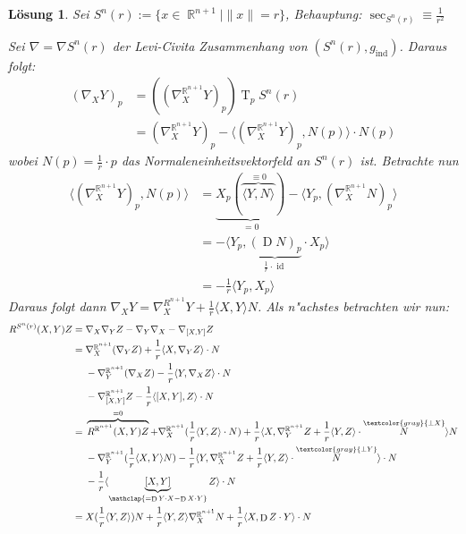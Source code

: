 \documentclass[paper=A4, twoside, chapterprefix=true, bibliography=totoc, headsepline]{scrbook}
\DeclareMathOperator{\R}{\mathbb{R}}
\DeclareMathOperator{\id}{id}       %
\DeclareMathOperator{\D}{D}         %
\DeclareMathOperator{\T}{T}         %
\theoremstyle{plain}
\theoremstyle{nonumberplain}
\theoremstyle{empty}
\theoremstyle{break}
\newtheorem{Loes}{L\"osung}
\begin{document}
\begin{Loes}
Sei $S^n(r) := \{x \in \R^{n+1} \mid \|x\| = r\}$, \emph{Behauptung:} $\sec_{S^n(r)} \equiv \frac{1}{r^2}$

Sei $\nabla = \nabla S^n(r)$ der Levi-Civita Zusammenhang von $(S^n(r), g_{\text{ind}})$. Daraus folgt:
\begin{align*}
	(\nabla_X Y)_p &= \left( (\nabla_X^{\R^{n+1}} Y)_p \right) \T_p S^n(r) \\
	&= (\nabla_X^{\R^{n+1}} Y)_p - \langle (\nabla_X^{\R^{n+1}} Y)_p, N(p) \rangle \cdot N(p)
\end{align*}
wobei $N(p) = \frac{1}{r} \cdot p$ das Normaleneinheitsvektorfeld an $S^n(r)$ ist. Betrachte nun
\begin{align*}
	\langle (\nabla_X^{\R^{n+1}} Y)_p, N(p) \rangle &= \underbrace{X_p ( \overbrace{\langle Y, N \rangle}^{\equiv 0} )}_{=0} - \langle Y_p, (\nabla_X^{\R^{n+1}} N)_p \rangle\\
	&= - \langle Y_p, \underbrace{(\D N)_p}_{\frac{1}{r}\cdot\id} \cdot X_p \rangle\\
	&= - \frac{1}{r} \langle Y_p, X_p \rangle
\end{align*}
Daraus folgt dann $\nabla_XY = \nabla_X^{R^{n+1}} Y + \frac{1}{r} \langle X, Y \rangle N$. Als n"achstes betrachten wir nun:
\begin{align*}
	R^{S^n(r)}(X,Y)Z ={}& \nabla_X \nabla_Y Z - \nabla_Y \nabla_X - \nabla_{[X,Y]}Z\\
	={}& \nabla_X^{\R^{n+1}} (\nabla_Y Z) + \frac{1}{r} \langle X, \nabla_Y Z \rangle \cdot N\\
		& - \nabla_Y^{\R^{n+1}} (\nabla_X Z) - \frac{1}{r} \langle Y, \nabla_X Z \rangle \cdot N\\
		& - \nabla_{[X,Y]}^{\R^{n+1}} Z - \frac{1}{r} \langle [X,Y], Z \rangle \cdot N\\
	={}& \overbrace{R^{\R^{n+1}} (X,Y)Z}^{=0} + \nabla_X^{\R^{n+1}} (\frac{1}{r} \langle Y, Z \rangle \cdot N) + \frac{1}{r} \langle X, \nabla_Y^{\R^{n+1}} Z + \frac{1}{r} \langle Y, Z \rangle \cdot \overset{\textcolor{gray}{\perp X}}{N} \rangle N\\
		& - \nabla_Y^{\R^{n+1}} ( \frac{1}{r} \langle X, Y \rangle N) - \frac{1}{r} \langle Y, \nabla_X^{\R^{n+1}} Z + \frac{1}{r} \langle Y, Z \rangle \cdot \overset{\textcolor{gray}{\perp Y}}{N} \rangle \cdot N\\
		& - \frac{1}{r} \langle \underbrace{[X,Y]}_{\mathclap{=\D Y \cdot X - \D X \cdot Y}} Z \rangle \cdot N\\
	={}& X(\frac{1}{r} \langle Y, Z \rangle) N + \frac{1}{r} \langle Y, Z \rangle \nabla_X^{\R^{n+1}} N + \frac{1}{r} \langle X, \D Z \cdot Y \rangle \cdot N\\

\end{align*}
\end{Loes}
\end{document}
